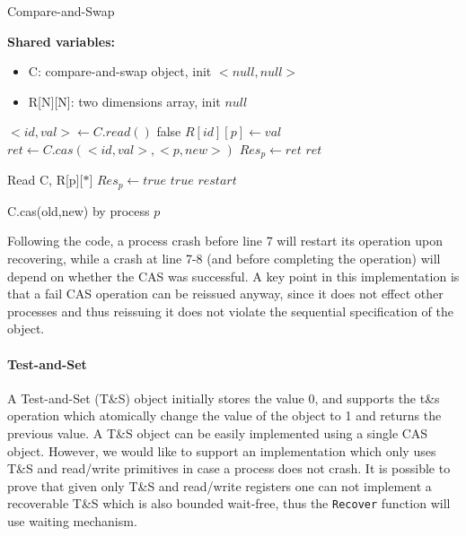 \begin{algorithm}
	\caption{Compare-and-Swap}\label{recoverable CAS}
	
	\hspace*{\algorithmicindent} \textbf{Shared variables:}
	\begin{itemize}
		\item C: compare-and-swap object, init $<null,null>$
		\item R[N][N]: two dimensions array, init $null$
	\end{itemize}
 
	\begin{algorithmic}[1]
		\State $<id,val> \gets C.read()$
		\State \Return false
		\EndIf
  		\State $R[id][p] \gets val$
		\EndIf
		\State $ret \gets C.cas(<id,val>, <p,new>)$
		\State $Res_p \gets ret$
		\State \Return $ret$
		\EndProcedure
		
		\State Read C, R[p][$*$]
		\State $Res_p \gets true$
		\State \Return $true$
		\Else {}
		\State \Return $restart$
		\EndIf
		\EndProcedure
	\end{algorithmic}
	\caption{C.cas(old,new) by process $p$}
\end{algorithm}


Following the code, a process crash before line 7 will restart its operation upon recovering, while a crash at line 7-8 (and before completing the operation) will depend on whether the CAS was successful. A key point in this implementation is that a fail CAS operation can be reissued anyway, since it does not effect other processes and thus reissuing it does not violate the sequential specification of the object. 


\paragraph*{Test-and-Set}

A Test-and-Set (T\&S) object initially stores the value 0, and supports the t\&s operation which atomically change the value of the object to 1 and returns the previous value. A T\&S object can be easily implemented using a single CAS object. However, we would like to support an implementation which only uses T\&S and read/write primitives in case a process does not crash. It is possible to prove that given only T\&S and read/write registers one can not implement a recoverable T\&S which is also bounded wait-free, thus the \texttt{Recover} function will use waiting mechanism.